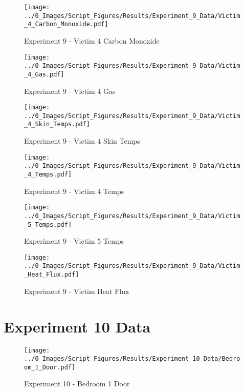 	\clearpage

	\begin{figure}[H]
		\centering
		\texttt{[image: ../0\_Images/Script\_Figures/Results/Experiment\_9\_Data/Victim\_4\_Carbon\_Monoxide.pdf]}
		\caption[]{Experiment 9 - Victim 4 Carbon Monoxide}
	\end{figure}
 

	\begin{figure}[H]
		\centering
		\texttt{[image: ../0\_Images/Script\_Figures/Results/Experiment\_9\_Data/Victim\_4\_Gas.pdf]}
		\caption[]{Experiment 9 - Victim 4 Gas}
	\end{figure}
 
	\clearpage

	\begin{figure}[H]
		\centering
		\texttt{[image: ../0\_Images/Script\_Figures/Results/Experiment\_9\_Data/Victim\_4\_Skin\_Temps.pdf]}
		\caption[]{Experiment 9 - Victim 4 Skin Temps}
	\end{figure}
 

	\begin{figure}[H]
		\centering
		\texttt{[image: ../0\_Images/Script\_Figures/Results/Experiment\_9\_Data/Victim\_4\_Temps.pdf]}
		\caption[]{Experiment 9 - Victim 4 Temps}
	\end{figure}
 
	\clearpage

	\begin{figure}[H]
		\centering
		\texttt{[image: ../0\_Images/Script\_Figures/Results/Experiment\_9\_Data/Victim\_5\_Temps.pdf]}
		\caption[]{Experiment 9 - Victim 5 Temps}
	\end{figure}
 

	\begin{figure}[H]
		\centering
		\texttt{[image: ../0\_Images/Script\_Figures/Results/Experiment\_9\_Data/Victim\_Heat\_Flux.pdf]}
		\caption[]{Experiment 9 - Victim Heat Flux}
	\end{figure}
 
	\clearpage

\clearpage		\large
\section{Experiment 10 Data} \label{App:Exp10Results} 

	\begin{figure}[H]
		\centering
		\texttt{[image: ../0\_Images/Script\_Figures/Results/Experiment\_10\_Data/Bedroom\_1\_Door.pdf]}
		\caption[]{Experiment 10 - Bedroom 1 Door}
	\end{figure}
 

